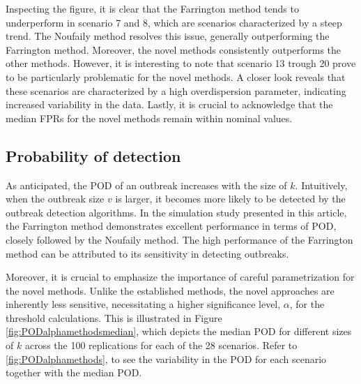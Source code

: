 \documentclass[preprint, 3p, authoryear]{elsarticle} %
\begin{document}
Inspecting the figure, it is clear that the Farrington method tends to underperform in scenario 7 and 8, which are scenarios characterized by a steep trend. The Noufaily method resolves this issue, generally outperforming the Farrington method. Moreover, the novel methods consistently outperforms the other methods. However, it is interesting to note that scenario 13 trough 20 prove to be particularly problematic for the novel methods. A closer look reveals that these scenarios are characterized by a high overdispersion parameter, indicating increased variability in the data. Lastly, it is crucial to acknowledge that the median FPRs for the novel methods remain within nominal values.

\hypertarget{probability-of-detection}{%
\subsection{Probability of detection}\label{probability-of-detection}}

As anticipated, the POD of an outbreak increases with the size of \(k\). Intuitively, when the outbreak size \(v\) is larger, it becomes more likely to be detected by the outbreak detection algorithms. In the simulation study presented in this article, the Farrington method demonstrates excellent performance in terms of POD, closely followed by the Noufaily method. The high performance of the Farrington method can be attributed to its sensitivity in detecting outbreaks.

Moreover, it is crucial to emphasize the importance of careful parametrization for the novel methods. Unlike the established methods, the novel approaches are inherently less sensitive, necessitating a higher significance level, \(\alpha\), for the threshold calculations. This is illustrated in Figure \ref{fig:PODalphamethodsmedian}, which depicts the median POD for different sizes of \(k\) across the 100 replications for each of the 28 scenarios. Refer to \ref{fig:PODalphamethods}, to see the variability in the POD for each scenario together with the median POD.
\end{document}
